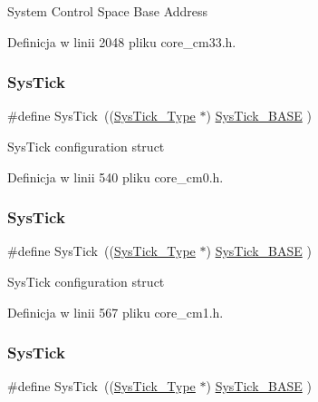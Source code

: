 System Control Space Base Address 

Definicja w linii 2048 pliku core\+\_\+cm33.\+h.

\mbox{\label{group___c_m_s_i_s__core__base_gacd96c53beeaff8f603fcda425eb295de}} 
\subsubsection{\texorpdfstring{Sys\+Tick}{SysTick}\hspace{0.1cm}{\footnotesize\ttfamily [1/12]}}
{\footnotesize\ttfamily \#define Sys\+Tick~((\hyperlink{struct_sys_tick___type}{Sys\+Tick\+\_\+\+Type}   $\ast$)     \hyperlink{group___c_m_s_i_s__core__base_ga58effaac0b93006b756d33209e814646}{Sys\+Tick\+\_\+\+B\+A\+SE}  )}

Sys\+Tick configuration struct 

Definicja w linii 540 pliku core\+\_\+cm0.\+h.

\mbox{\label{group___c_m_s_i_s__core__base_gacd96c53beeaff8f603fcda425eb295de}} 
\subsubsection{\texorpdfstring{Sys\+Tick}{SysTick}\hspace{0.1cm}{\footnotesize\ttfamily [2/12]}}
{\footnotesize\ttfamily \#define Sys\+Tick~((\hyperlink{struct_sys_tick___type}{Sys\+Tick\+\_\+\+Type}   $\ast$)     \hyperlink{group___c_m_s_i_s__core__base_ga58effaac0b93006b756d33209e814646}{Sys\+Tick\+\_\+\+B\+A\+SE}  )}

Sys\+Tick configuration struct 

Definicja w linii 567 pliku core\+\_\+cm1.\+h.

\mbox{\label{group___c_m_s_i_s__core__base_gacd96c53beeaff8f603fcda425eb295de}} 
\subsubsection{\texorpdfstring{Sys\+Tick}{SysTick}\hspace{0.1cm}{\footnotesize\ttfamily [3/12]}}
{\footnotesize\ttfamily \#define Sys\+Tick~((\hyperlink{struct_sys_tick___type}{Sys\+Tick\+\_\+\+Type}   $\ast$)     \hyperlink{group___c_m_s_i_s__core__base_ga58effaac0b93006b756d33209e814646}{Sys\+Tick\+\_\+\+B\+A\+SE}  )}

